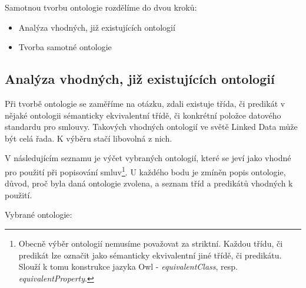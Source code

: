 \bigskip
\noindent
Samotnou tvorbu ontologie rozdělíme do dvou kroků:

\begin{itemize}
\item Analýza vhodných, již existujících ontologií
\item Tvorba samotné ontologie
\end{itemize}

\subsection{Analýza vhodných, již existujících ontologií}

Při tvorbě ontologie se zaměříme na otázku, zdali existuje třída, či predikát v nějaké ontologii sémanticky ekvivalentní třídě, či konkrétní položce datového standardu pro smlouvy. Takových vhodných ontologií ve světě Linked Data může být celá řada. K výběru stačí libovolná z nich. 

V následujícím seznamu je výčet vybraných ontologií, které se jeví jako vhodné pro použití při popisování smluv\footnote{Obecně výběr ontologií nemusíme považovat za striktní. Každou třídu, či predikát lze označit jako sémanticky ekvivalentní jiné třídě, či predikátu. Slouží k tomu konstrukce jazyka Owl - \textit{equivalentClass}, resp. \textit{equivalentProperty}.}. U každého bodu je zmíněn popis ontologie, důvod, proč byla daná ontologie zvolena, a seznam tříd a predikátů vhodných k použití.

\bigskip
\noindent
Vybrané ontologie:

